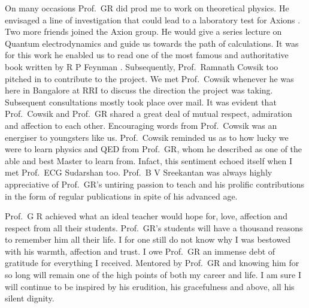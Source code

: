 On many occasions Prof.\ GR did prod me to work on theoretical physics. He
envisaged a line of investigation that could lead to a laboratory test for Axions
\cite{chap31-key17}. Two more friends joined the Axion group. He would give a series lecture
on Quantum electrodynamics and guide us towards the path of calculations. It
was for this work he enabled us to read one of the most famous and authoritative
book written by R P Feynman \cite{chap31-key18}. Subsequently, Prof.\ Ramnath Cowsik too
pitched in to contribute to the project. We met Prof.\ Cowsik whenever he was here
in Bangalore at RRI to discuss the direction the project was taking. Subsequent
consultations mostly took place over mail. It was evident that Prof.\ Cowsik and
Prof.\ GR shared a great deal of mutual respect, admiration and affection to each
other. Encouraging words from Prof.\ Cowsik was an energiser to youngsters like
us. Prof.\ Cowsik reminded us as to how lucky we were to learn physics and QED
from Prof.\ GR, whom he described as one of the able and best Master to learn
from. Infact, this sentiment echoed itself when I met Prof.\ ECG Sudarshan too.
Prof.\ B V Sreekantan was always highly appreciative of Prof.\ GR's untiring
passion to teach and his prolific contributions in the form of regular publications
in spite of his advanced age.

Prof.\ G R achieved what an ideal teacher would hope for, love, affection and
respect from all their students. Prof.\ GR's students will have a thousand reasons
to remember him all their life. I for one still do not know why I was bestowed
with his warmth, affection and trust. I owe Prof.\ GR an immense debt of gratitude
for everything I received. Mentored by Prof.\ GR and knowing him for so long will
remain one of the high points of both my career and life. I am sure I will continue
to be inspired by his erudition, his gracefulness and above, all his silent dignity.


